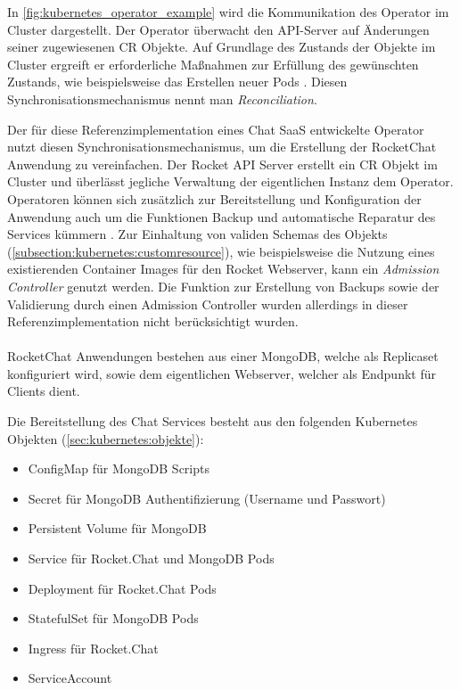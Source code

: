 In \ref{fig:kubernetes_operator_example} wird die Kommunikation des Operator im Cluster dargestellt.
Der Operator überwacht den API-Server auf Änderungen seiner zugewiesenen \ac{CR} Objekte. 
Auf Grundlage des Zustands der Objekte im Cluster ergreift er erforderliche Maßnahmen zur Erfüllung des gewünschten Zustands, 
wie beispielsweise das Erstellen neuer Pods \cite{Dobies2020}.
Diesen Synchronisationsmechanismus nennt man \emph{Reconciliation}.

Der für diese Referenzimplementation eines Chat \ac{SaaS} entwickelte Operator nutzt diesen Synchronisationsmechanismus,
um die Erstellung der RocketChat Anwendung zu vereinfachen. 
Der Rocket API Server erstellt ein \ac{CR} Objekt im Cluster und überlässt jegliche Verwaltung der eigentlichen Instanz dem Operator.
Operatoren können sich zusätzlich zur Bereitstellung und Konfiguration der Anwendung auch um die Funktionen Backup 
und automatische Reparatur des Services kümmern \cite{Dobies2020}.
Zur Einhaltung von validen Schemas des Objekts (\ref{subsection:kubernetes:customresource}),
wie beispielsweise die Nutzung eines existierenden Container Images für den Rocket Webserver,
kann ein \emph{Admission Controller} genutzt werden.
Die Funktion zur Erstellung von Backups sowie der Validierung durch einen Admission Controller
wurden allerdings in dieser Referenzimplementation nicht berücksichtigt wurden.


\paragraph{}
RocketChat Anwendungen bestehen aus einer MongoDB, welche als Replicaset konfiguriert wird,
sowie dem eigentlichen Webserver, welcher als Endpunkt für Clients dient.

Die Bereitstellung des Chat Services besteht aus den folgenden Kubernetes Objekten (\ref{sec:kubernetes:objekte}):
\begin{itemize}
  \item ConfigMap für MongoDB Scripts
  \item Secret für MongoDB Authentifizierung (Username und Passwort)
  \item Persistent Volume für MongoDB
  \item Service für Rocket.Chat und MongoDB Pods
  \item Deployment für Rocket.Chat Pods
  \item StatefulSet für MongoDB Pods
  \item Ingress für Rocket.Chat
  \item ServiceAccount
\end{itemize} 

